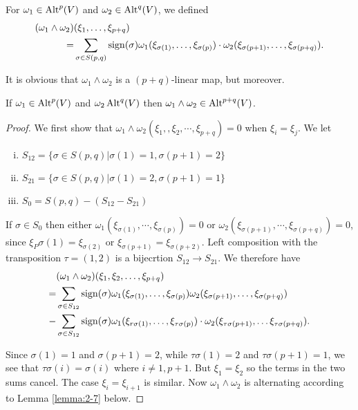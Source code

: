 \begin{definition}\label{def:2-5}
  For $\omega_1\in\operatorname{Alt}^p(V)$ and $\omega_2\in\operatorname{Alt}^q(V)$, we defined
  \begin{align*}
    (\omega_1\wedge\omega_2) & (\xi_1,\ldots,\xi_{p+q})                                                             \\
    =                        & \sum_{\sigma\in S(p,q)}\operatorname{sign}(\sigma)\omega_1(\xi_{\sigma(1)},\ldots,\xi_{\sigma(p)})
    \cdot\omega_2(\xi_{\sigma(p+1)},\ldots,\xi_{\sigma(p+q)}).
  \end{align*}

  It is obvious that $\omega_1\wedge\omega_2$ is a $(p+q)$-linear map, but moreover.
\end{definition}

\begin{lemma}\label{lemma:2-2}
  If $\omega_1\in\operatorname{Alt}^p(V)$ and $\omega_2\operatorname{Alt}^q(V)$ then $\omega_1\wedge\omega_2\in\operatorname{Alt}^{p+q}(V)$.
\end{lemma}

\begin{proof}
  We first show that $\omega_1\wedge\omega_2(\xi_1,, \xi_2, \cdots, \xi_{p+q}) = 0$ when $\xi_i = \xi_j$.
  We let
  \begin{enumerate}[(i)]
    \item $S_{12} = \{\sigma\in S(p, q) | \sigma(1) = 1, \sigma(p+1) = 2\}$
    \item $S_{21} = \{\sigma\in S(p, q) | \sigma(1) = 2, \sigma(p+1) = 1\}$
    \item $S_0 = S(p, q) - (S_{12} - S_{21})$
  \end{enumerate}

  If $\sigma\in S_0$ then either $\omega_1(\xi_{\sigma(1)}, \cdots, \xi_{\sigma(p)}) = 0$
  or $\omega_2(\xi_{\sigma(p+1)}, \cdots, \xi_{\sigma(p+q)}) = 0$, since $\xi_P\sigma(1) = \xi_{\sigma(2)}$
  or $\xi_{\sigma(p+1)} = \xi_{\sigma(p+2)}$. Left composition with  the transposition $\tau = (1, 2)$ is a bijecrtion
  $S_{12}\to S_{21}$. We therefore have
  \begin{align*}
      & (\omega_{1}\wedge\omega_{2})(\xi_{1},\xi_{2},\ldots,\xi_{p+q})                                                                                             \\
    = & \sum_{\sigma\in S_{12}}\operatorname{sign}(\sigma)\omega_1(\xi_{\sigma(1)},\ldots,\xi_{\sigma(p)})\omega_2(\xi_{\sigma(p+1)},\ldots,\xi_{\sigma(p+q)})                   \\
    - & \sum_{\sigma\in S_{12}}\operatorname{sign}(\sigma)\omega_1(\xi_{r\sigma(1)},\ldots,\xi_{\tau\sigma(p)})\cdot\omega_2(\xi_{\tau\sigma(p+1)},\ldots\xi_{\tau\sigma(p+q)}).
  \end{align*}

  Since $\sigma(1) = 1$ and $\sigma(p+1) = 2$, while $\tau\sigma(1) = 2$ and $\tau\sigma(p+1) = 1$, we see that
  $\tau\sigma(i) = \sigma(i)$ where $i\neq 1, p+1$. But $\xi_1 = \xi_2$ so the terms in the two sums cancel.
  The case $\xi_i = \xi_{i+1}$ is similar. Now $\omega_1\wedge\omega_2$ is alternating according to Lemma \ref{lemma:2-7} below.
\end{proof}

